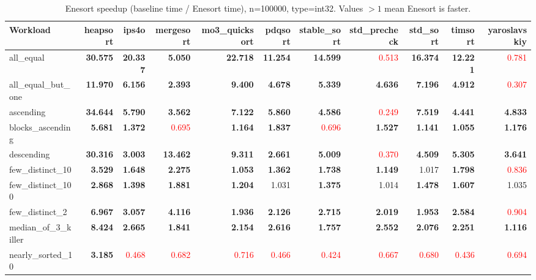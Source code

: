 \begin{table}[h]\centering
\caption{Enesort speedup (baseline time / Enesort time), n=100000, type=int32. Values $>1$ mean Enesort is faster.}
\begin{tabular}{lrrrrrrrrrr}
\toprule
Workload & heapsort & ips4o & mergesort & mo3_quicksort & pdqsort & stable_sort & std_precheck & std_sort & timsort & yaroslavskiy \\
\midrule
all\_equal & \textbf{30.575} & \textbf{20.337} & \textbf{5.050} & \textbf{22.718} & \textbf{11.254} & \textbf{14.599} & \textcolor{red}{0.513} & \textbf{16.374} & \textbf{12.221} & \textcolor{red}{0.781} \\
all\_equal\_but\_one & \textbf{11.970} & \textbf{6.156} & \textbf{2.393} & \textbf{9.400} & \textbf{4.678} & \textbf{5.339} & \textbf{4.636} & \textbf{7.196} & \textbf{4.912} & \textcolor{red}{0.307} \\
ascending & \textbf{34.644} & \textbf{5.790} & \textbf{3.562} & \textbf{7.122} & \textbf{5.860} & \textbf{4.586} & \textcolor{red}{0.249} & \textbf{7.519} & \textbf{4.441} & \textbf{4.833} \\
blocks\_ascending & \textbf{5.681} & \textbf{1.372} & \textcolor{red}{0.695} & \textbf{1.164} & \textbf{1.837} & \textcolor{red}{0.696} & \textbf{1.527} & \textbf{1.141} & \textbf{1.055} & \textbf{1.176} \\
descending & \textbf{30.316} & \textbf{3.003} & \textbf{13.462} & \textbf{9.311} & \textbf{2.661} & \textbf{5.009} & \textcolor{red}{0.370} & \textbf{4.509} & \textbf{5.305} & \textbf{3.641} \\
few\_distinct\_10 & \textbf{3.529} & \textbf{1.648} & \textbf{2.275} & \textbf{1.053} & \textbf{1.362} & \textbf{1.738} & \textbf{1.149} & 1.017 & \textbf{1.798} & \textcolor{red}{0.836} \\
few\_distinct\_100 & \textbf{2.868} & \textbf{1.398} & \textbf{1.881} & \textbf{1.204} & 1.031 & \textbf{1.375} & 1.014 & \textbf{1.478} & \textbf{1.607} & 1.035 \\
few\_distinct\_2 & \textbf{6.967} & \textbf{3.057} & \textbf{4.116} & \textbf{1.936} & \textbf{2.126} & \textbf{2.715} & \textbf{2.019} & \textbf{1.953} & \textbf{2.584} & \textcolor{red}{0.904} \\
median\_of\_3\_killer & \textbf{8.424} & \textbf{2.665} & \textbf{1.841} & \textbf{2.154} & \textbf{2.616} & \textbf{1.757} & \textbf{2.552} & \textbf{2.076} & \textbf{2.251} & \textbf{1.116} \\
nearly\_sorted\_10 & \textbf{3.185} & \textcolor{red}{0.468} & \textcolor{red}{0.682} & \textcolor{red}{0.716} & \textcolor{red}{0.466} & \textcolor{red}{0.424} & \textcolor{red}{0.667} & \textcolor{red}{0.680} & \textcolor{red}{0.436} & \textcolor{red}{0.694} \\

\end{tabular}
\end{table}
